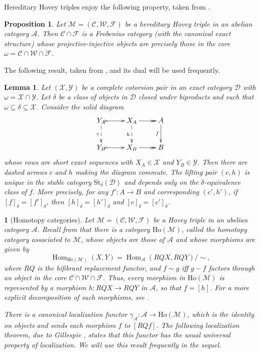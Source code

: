 \documentclass[12pt,twoside]{amsart}
\theoremstyle{bfupright head,slanted body}
\theoremstyle{bfupright head,upright body}
\newtheorem{bfhpg}[res]{}               \newtheorem*{bfhpg*}{}
\theoremstyle{fixed bf head,slanted body}
\newtheorem{prp}[res]{Proposition}      \newtheorem*{prp*}{Proposition}
\newtheorem{lem}[res]{Lemma}            \newtheorem*{lem*}{Lemma}
\theoremstyle{fixed bf head,upright body}
\theoremstyle{numbered paragraph}
\newcommand{\thmcite}[2][?]{\cite[Theorem~#1]{#2}}
\newcommand{\prpcite}[2][?]{\cite[Proposition~#1]{#2}}
\numberwithin{equation}{res}
\newcommand{\calC}{\mathcal{C}}
\newcommand{\calW}{\mathcal{W}}
\newcommand{\calF}{\mathcal{F}}
\newcommand{\calA}{\mathcal{A}}
\newcommand{\calD}{\mathcal{D}}
\newcommand{\calM}{\mathcal{M}}
\newcommand{\calX}{\mathcal{X}}
\newcommand{\calY}{\mathcal{Y}}
\newcommand{\Ho}{\mathrm{Ho}}
\newcommand{\St}{\mathrm{St}}
\newcommand{\Hom}{\operatorname{Hom}}
\begin{document}
Hereditary Hovey triples enjoy the following property, taken from \prpcite[4.2]{2016Gill}.

\begin{prp}
Let \(\calM = (\calC, \calW, \calF)\) be a hereditary Hovey triple in an abelian category \(\calA\).
Then \(\calC \cap \calF\) is a Frobenius category (with the canonical exact structure) whose projective-injective objects are precisely those in the core \(\omega = \calC \cap \calW \cap \calF\).
\end{prp}

The following result, taken from \cite[Lemma 3.3]{2025GillBook}, and its dual will be used frequently.

\begin{lem}\label{fundamental Lemma}
Let \((\calX,\calY)\) be a complete cotorsion pair in an exact category \(\calD\) with \(\omega=\calX\cap\calY\). Let \(\delta\) be a class of objects in \(\calD\) closed under biproducts and such that \(\omega\subseteq\delta\subseteq\calX\). Consider the solid diagram
\[
\xymatrix{
   Y_A
 \ar@{-->}[d]_-{c} \ar@{>->}[r]
 & X_A
 \ar@{-->}[d]_-{h} \ar@{->>}[r]
 & A
 \ar[d]_-{f}  \\
   Y_B
 \ar@{>->}[r]
 & X_B
 \ar@{->>}[r]
 & B
 }
\]
whose rows are short exact sequences with \(X_A\in\calX\) and \(Y_B\in\calY\). Then there are dashed arrows \(c\) and \(h\) making the diagram commute. The lifting pair \((c,h)\) is unique in the stable category \(\St_\delta(\calD)\) and depends only on the \(\delta\)-equivalence class of \(f\). More precisely,
for any \(f':A\to B\) and corresponding \((c',h')\), if \([f]_\delta=[f']_\delta\), then \([h]_\delta=[h']_\delta\) and \([c]_\delta=[c']_\delta\).
\end{lem}

\begin{bfhpg}[Homotopy categories]\label{tri structure of Ho(A)}
Let \(\calM=(\calC,\calW,\calF)\) be a Hovey triple in an abelian category \(\calA\).
Recall from \thmcite[2.6]{2016Gill} that there is a category \(\Ho(\calM)\), called the \emph{homotopy category} associated to \(\calM\), whose objects are those of \(\calA\) and whose morphisms are given by
\[
\Hom_{\Ho(\calM)}(X,Y)=\Hom_\calA(RQX,RQY)/\sim,
\]
where \(RQ\) is the bifibrant replacement functor, and \(f\sim g\) iff \(g-f\) factors through an object in the core \(\calC\cap\calW\cap\calF\).
Thus, every morphism in \(\Ho(\calM)\) is represented by a morphism \(h:RQX\to RQY\) in \(\calA\), so that \(f=[h]\).
For a more explicit decomposition of such morphisms, see \cite[Proposition 5.15]{2025GillBook}.

There is a canonical localization functor \(\gamma_{\calA}:\calA\to\Ho(\calM)\), which is the identity on objects and sends each morphism \(f\) to \([RQf]\).
The following localization theorem, due to Gillespie \cite[Theorem 5.21]{2025GillBook}, states that this functor has the usual universal property of localization.
We will use this result frequently in the sequel.
\end{bfhpg}
\end{document}
